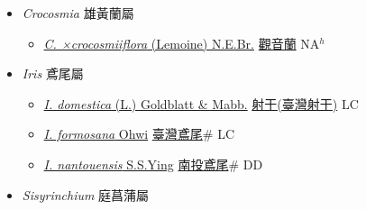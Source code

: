
  \begin{itemize}
 \item[] \textit{Crocosmia} 雄黃蘭屬
                    
  \begin{itemize}
        \item[] \href{http://www.theplantlist.org/tpl1.1/search?q=Crocosmia+×crocosmiiflora}{\textit{C. ×crocosmiiflora} (Lemoine) N.E.Br.}   \href{\detokenize{http://taibnet.sinica.edu.tw/chi/taibnet_species_list.php?T2=觀音蘭&T2_new_value=true&fr=y}}{觀音蘭} NA$^h$
  \end{itemize}
 \item[] \textit{Iris} 鳶尾屬
                    
  \begin{itemize}
        \item[] \href{http://www.theplantlist.org/tpl1.1/search?q=Iris+domestica}{\textit{I. domestica} (L.) Goldblatt \& Mabb.}        \href{\detokenize{http://taibnet.sinica.edu.tw/chi/taibnet_species_list.php?T2=射干&T2_new_value=true&fr=y}}{射干(臺灣射干)}   LC
        \item[] \href{http://www.theplantlist.org/tpl1.1/search?q=Iris+formosana}{\textit{I. formosana} Ohwi}   \href{\detokenize{http://taibnet.sinica.edu.tw/chi/taibnet_species_list.php?T2=臺灣鳶尾&T2_new_value=true&fr=y}}{臺灣鳶尾}\# LC
        \item[] \href{http://www.theplantlist.org/tpl1.1/search?q=Iris+nantouensis}{\textit{I. nantouensis} S.S.Ying}   \href{\detokenize{http://taibnet.sinica.edu.tw/chi/taibnet_species_list.php?T2=南投鳶尾&T2_new_value=true&fr=y}}{南投鳶尾}\# DD
  \end{itemize}
 \item[] \textit{Sisyrinchium} 庭菖蒲屬
                    

\end{itemize}
